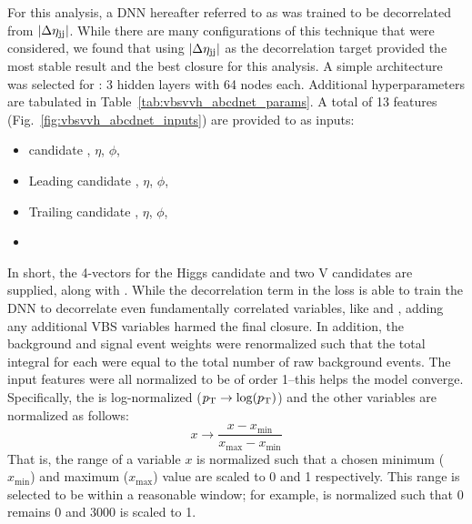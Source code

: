 For this analysis, a DNN hereafter referred to as \ABCDNet was trained to be decorrelated from $|\Delta\eta_{\mathrm{j}\mathrm{j}}|$.
While there are many configurations of this technique that were considered, we found that using $|\Delta\eta_{\mathrm{j}\mathrm{j}}|$ as the decorrelation target provided the most stable result and the best closure for this analysis. 
A simple architecture was selected for \ABCDNet: 3 hidden layers with 64 nodes each. 
Additional hyperparameters are tabulated in Table~\ref{tab:vbsvvh_abcdnet_params}. 
A total of 13 features (Fig.~\ref{fig:vbsvvh_abcdnet_inputs}) are provided to \ABCDNet as inputs:
\begin{itemize}
    \item \Htobb candidate \pt, $\eta$, $\phi$, \MPNet
    \item Leading \Vtoqq candidate \pt, $\eta$, $\phi$, \MPNet
    \item Trailing \Vtoqq candidate \pt, $\eta$, $\phi$, \MPNet
    \item \Mjj
\end{itemize}
In short, the 4-vectors for the Higgs candidate and two V candidates are supplied, along with \Mjj. 
While the decorrelation term in the loss is able to train the DNN to decorrelate even fundamentally correlated variables, like \Mjj and \detajj, adding any additional VBS variables harmed the final closure. 
In addition, the background and signal event weights were renormalized such that the total integral for each were equal to the total number of raw background events.
The input features were all normalized to be of order 1--this helps the model converge. 
Specifically, the \pt is log-normalized ($p_{\mathrm{T}} \rightarrow \log(p_{\mathrm{T}})$) and the other variables are normalized as follows:
\begin{equation}
    x \rightarrow \frac{x - x_\text{min}}{x_\text{max} - x_\text{min}}
\end{equation}
That is, the range of a variable $x$ is normalized such that a chosen minimum ($x_\text{min}$) and maximum ($x_\text{max}$) value are scaled to 0 and 1 respectively. 
This range is selected to be within a reasonable window; for example, \Mjj is normalized such that 0 remains 0 and 3000 is scaled to 1.

